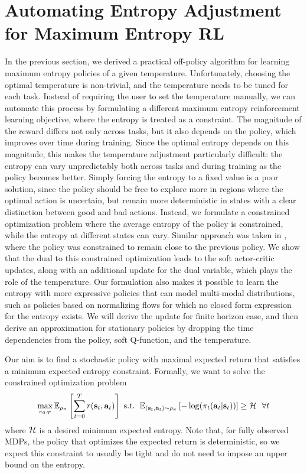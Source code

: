 \section{Automating Entropy Adjustment for Maximum Entropy RL}
\label{sec:entropy_constraint}
In the previous section, we derived a practical off-policy algorithm for learning maximum entropy policies of a given temperature. Unfortunately, choosing the optimal temperature is non-trivial, and the temperature needs to be tuned for each task. Instead of requiring the user to set the temperature manually, we can automate this process by formulating a different maximum entropy reinforcement learning objective, where the entropy is treated as a constraint. The magnitude of the reward differs not only across tasks, but it also depends on the policy, which improves over time during training. Since the optimal entropy depends on this magnitude, this makes the temperature adjustment particularly difficult: the entropy can vary unpredictably both across tasks and during training as the policy becomes better. Simply forcing the entropy to a fixed value is a poor solution, since the policy should be free to explore more in regions where the optimal action is uncertain, but remain more deterministic in states with a clear distinction between good and bad actions. Instead, we formulate a constrained optimization problem where the average entropy of the policy is constrained, while the entropy at different states can vary. Similar approach was taken in \cite{abdolmaleki2018maximum}, where the policy was constrained to remain close to the previous policy. We show that the dual to this constrained optimization leads to the soft actor-critic updates, along with an additional update for the dual variable, which plays the role of the temperature. Our formulation also makes it possible to learn the entropy with more expressive policies that can model multi-modal distributions, such as policies based on normalizing flows \cite{haarnoja2018latent} for which no closed form expression for the entropy exists. We will derive the update for finite horizon case, and then derive an approximation for stationary policies by dropping the time dependencies from the policy, soft Q-function, and the temperature.


%
Our aim is to find a stochastic policy with maximal expected return that satisfies a minimum expected entropy constraint. Formally, we want to solve the constrained optimization problem
\begin{align}
    \max_{\pi_{0:T}} \E{\rho_\pi}{\sum_{t=0}^T r(\st,\at)} \text{ s.t. } \E{(\st, \at)\sim\rho_\pi}{-\log(\pi_t(\at|\st))} \geq \entropy\ \ \forall t
    \label{eq:ecsac:contrained_rl}
\end{align}
where $\mathcal{H}$ is a desired minimum expected entropy. Note that, for fully observed MDPs, the policy that optimizes the expected return is deterministic, so we expect this constraint to usually be tight and do not need to impose an upper bound on the entropy.

